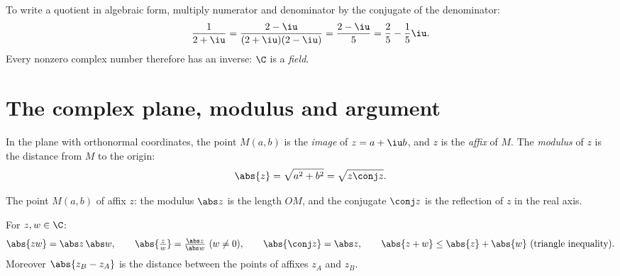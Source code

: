 \begin{method}\label{met:tle:complex:division}
To write a quotient in algebraic form, multiply numerator and denominator by
the conjugate of the denominator:
\[
\frac{1}{2 + \iu} = \frac{2 - \iu}{(2+\iu)(2-\iu)} = \frac{2 - \iu}{5}
= \frac25 - \frac15\iu .
\]
Every nonzero complex number therefore has an inverse: $\C$ is a
\emph{field}.
\end{method}

\section{The complex plane, modulus and argument}

\begin{definition}\label{def:tle:complex:modulus}
In the plane with orthonormal coordinates, the point $M(a, b)$ is the
\emph{image} of $z = a + \iu b$, and $z$ is the \emph{affix} of $M$. The
\emph{modulus} of $z$ is the distance from $M$ to the origin:
\[
\abs{z} = \sqrt{a^2 + b^2} = \sqrt{z\conj z}.
\]
\end{definition}

\begin{omfigure}

{\small The point $M(a,b)$ of affix $z$: the modulus $\abs z$ is the
length $OM$, and the conjugate $\conj z$ is the reflection of $z$ in the
real axis.}
\end{omfigure}

\begin{proposition}\label{prop:tle:complex:modulus}
For $z, w \in \C$:
\[
\abs{zw} = \abs z\,\abs w, \qquad
\abs{\tfrac zw} = \tfrac{\abs z}{\abs w}\ (w \neq 0), \qquad
\abs{\conj z} = \abs z, \qquad
\abs{z + w} \leq \abs{z} + \abs{w} \ \text{(triangle inequality)}.
\]
Moreover $\abs{z_B - z_A}$ is the distance between the points of affixes
$z_A$ and $z_B$.
\end{proposition}

